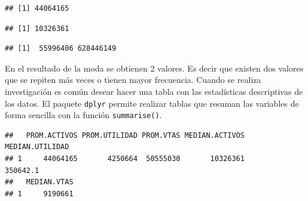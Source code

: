 \documentclass[]{book}
\newenvironment{Shaded}{\begin{snugshade}}{\end{snugshade}}
\newcommand{\DataTypeTok}[1]{\textcolor[rgb]{0.13,0.29,0.53}{#1}}
\newcommand{\KeywordTok}[1]{\textcolor[rgb]{0.13,0.29,0.53}{\textbf{#1}}}
\newcommand{\NormalTok}[1]{#1}
\newcommand{\OperatorTok}[1]{\textcolor[rgb]{0.81,0.36,0.00}{\textbf{#1}}}
\newcommand{\StringTok}[1]{\textcolor[rgb]{0.31,0.60,0.02}{#1}}
\begin{document}
\begin{verbatim}
## [1] 44064165
\end{verbatim}

\begin{Shaded}
\end{Shaded}

\begin{verbatim}
## [1] 10326361
\end{verbatim}

\begin{Shaded}
\end{Shaded}

\begin{verbatim}
## [1]  55996406 628446149
\end{verbatim}

En el resultado de la moda se obtienen 2 valores. Es decir que existen dos valores que se repiten más veces o tienen mayor frecuencia. Cuando se realiza investigación es común desear hacer una tabla con las estadísticas descriptivas de los datos. El paquete \texttt{dplyr} permite realizar tablas que resuman las variables de forma sencilla con la función \texttt{summarise()}.

\begin{Shaded}
\end{Shaded}

\begin{verbatim}
##   PROM.ACTIVOS PROM.UTILIDAD PROM.VTAS MEDIAN.ACTIVOS MEDIAN.UTILIDAD
## 1     44064165       4250664  50555030       10326361        350642.1
##   MEDIAN.VTAS
## 1     9190661
\end{verbatim}
\end{document}
